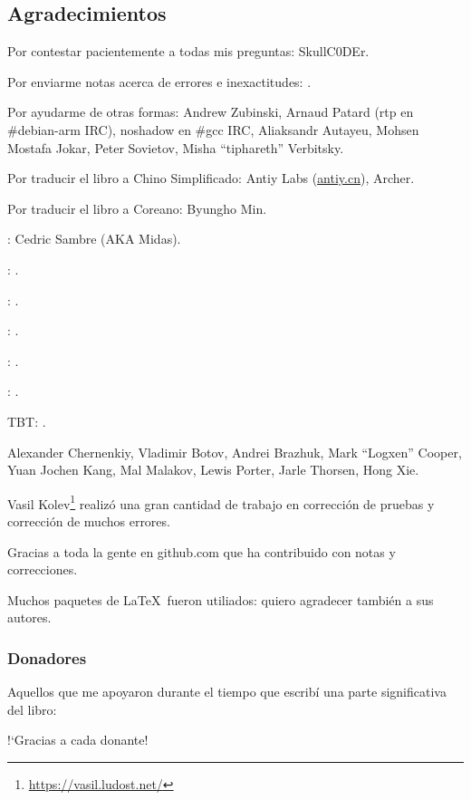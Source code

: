 \subsection*{Agradecimientos}

Por contestar pacientemente a todas mis preguntas: SkullC0DEr.

Por enviarme notas acerca de errores e inexactitudes: \PeopleMistakesInaccuracies{}.

Por ayudarme de otras formas:
Andrew Zubinski,
Arnaud Patard (rtp en \#debian-arm IRC),
noshadow en \#gcc IRC,
Aliaksandr Autayeu,
Mohsen Mostafa Jokar,
Peter Sovietov,
Misha ``tiphareth'' Verbitsky.

Por traducir el libro a Chino Simplificado:
Antiy Labs (\href{http://antiy.cn}{antiy.cn}), Archer.

Por traducir el libro a Coreano: Byungho Min.

\ESph{}: Cedric Sambre (AKA Midas).

\ESph{}: \PeopleSpanishTranslators{}.

\ESph{}: \PeoplePTBRTranslators{}.

\ESph{}: \PeopleItalianTranslators{}.

\ESph{}: \PeopleFrenchTranslators{}.

\DEph{}: \PeopleGermanTranslators{}.

\ac{TBT}: \PeoplePolishTranslators{}.


%
Alexander  Chernenkiy,
Vladimir Botov,
Andrei Brazhuk,
Mark ``Logxen'' Cooper, Yuan Jochen Kang, Mal Malakov, Lewis Porter, Jarle Thorsen, Hong Xie.

Vasil Kolev\footnote{\url{https://vasil.ludost.net/}} realiz\'o una gran cantidad de trabajo en correcci\'on de pruebas y correcci\'on de muchos errores.

Gracias a toda la gente en github.com que ha contribuido con notas y correcciones.

Muchos paquetes de \LaTeX\ fueron utiliados: quiero agradecer tambi\'en a sus autores.

\subsubsection*{Donadores}

Aquellos que me apoyaron durante el tiempo que escrib\'i una parte significativa del libro:



!`Gracias a cada donante!

